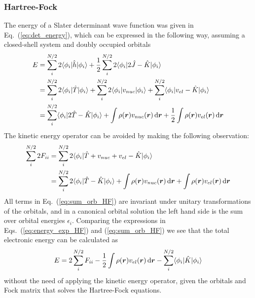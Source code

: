 \subsubsection{Hartree-Fock}
The energy of a Slater determinant wave function was given in Eq.~(\ref{eq:det_energy}), 
which can be expressed in the following way, assuming a closed-shell system and doubly
occupied orbitals
\begin{align}
    E	&= \sum_i^{N/2} 2\langle \phi_i|\hat{h}|\phi_i \rangle
	    + \frac{1}{2} \sum_i^{N/2} 2\langle \phi_i|2\hat{J} - \hat{K}|\phi_i \rangle\\
	&= \sum_i^{N/2} 2\langle \phi_i|\hat{T}|\phi_i \rangle
	    + \sum_i^{N/2} 2\langle \phi_i|v_{nuc}|\phi_i \rangle
	    + \sum_i^{N/2} \langle \phi_i|v_{el} - \hat{K}|\phi_i \rangle \\
	&= \sum_i^{N/2} \langle \phi_i|2\hat{T} - \hat{K}|\phi_i \rangle
	    + \int \rho(\boldsymbol r)v_{nuc}(\boldsymbol r) \,\mathrm{d}\boldsymbol r
	    + \frac{1}{2} \int \rho(\boldsymbol r)v_{el}(\boldsymbol r) \,\mathrm{d}\boldsymbol r
\end{align}
The kinetic energy operator can be avoided by making the following observation:
\begin{align}
    \label{eq:sum_orb_HF}
    \sum_i^{N/2} 2 F_{ii} &= \sum_i^{N/2} 2\langle\phi_i|\hat{T}+v_{nuc}+v_{el}-\hat{K}|\phi_i\rangle\\
		    &= \sum_i^{N/2} 2\langle\phi_i|\hat{T} - \hat{K}|\phi_i\rangle
		     + \int \rho(\boldsymbol r)v_{nuc}(\boldsymbol r) \,\mathrm{d}\boldsymbol r
		     + \int \rho(\boldsymbol r)v_{el}(\boldsymbol r) \,\mathrm{d}\boldsymbol r
\end{align}
All terms in Eq.~(\ref{eq:sum_orb_HF}) are invariant under unitary transformations of the orbitals,
and in a canonical orbital solution the left hand side is the sum over orbital energies $\epsilon_i$.
Comparing the expressions in Eqs.~(\ref{eq:energy_exp_HF}) and (\ref{eq:sum_orb_HF}) we see that
the total electronic energy can be calculated as
\begin{equation}
    E = 2 \sum_i^{N/2} F_{ii} - \frac{1}{2} \int \rho(\boldsymbol r)v_{el}(\boldsymbol r) \,\mathrm{d}\boldsymbol r
	- \sum_i^{N/2} \langle\phi_i|\hat{K}|\phi_i\rangle
\end{equation}
without the need of applying the kinetic energy operator, given the orbitals and Fock matrix that
solves the Hartree-Fock equations.

